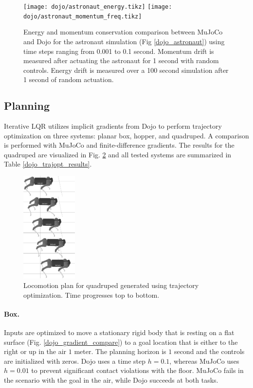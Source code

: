 \begin{figure}[H]
	\begin{center}
		\texttt{[image: dojo/astronaut\_energy.tikz]}
		\texttt{[image: dojo/astronaut\_momentum\_freq.tikz]}
	\end{center}
	\caption[Astronaut energy and momentum drift numerical comparison between Dojo and MuJoCo]{
		Energy and momentum conservation comparison between MuJoCo and Dojo for the astronaut simulation (Fig \ref{dojo_astronaut}) using time steps ranging from 0.001 to 0.1 second. Momentum drift is measured after actuating the astronaut for 1 second with random controls. Energy drift is measured over a 100 second simulation after 1 second of random actuation.}
	\label{dojo_drift}
\end{figure}

\subsection{Planning} 

Iterative LQR \cite{howell2022trajectory} utilizes implicit gradients from Dojo to perform trajectory optimization on three systems: planar box, hopper, and quadruped. A comparison is performed with MuJoCo and finite-difference gradients. The results for the quadruped are visualized in Fig. \ref{dojo_trajopt_vis} and all tested systems are summarized in Table \ref{dojo_trajopt_results}. 

\begin{figure}[H]
	\centering
	\includegraphics[width=0.25\textwidth]{dojo/quadruped_stack.png}
	\caption[Locomotion plan for quadruped]{Locomotion plan for quadruped generated using trajectory optimization. Time progresses top to bottom.}
	\label{dojo_trajopt_vis}
\end{figure}

\paragraph{Box.} Inputs are optimized to move a stationary rigid body that is resting on a flat surface (Fig. \ref{dojo_gradient_compare}) to a goal location that is either to the right or up in the air $1$ meter. The planning horizon is $1$ second and the controls are initialized with zeros. Dojo uses a time step $h = 0.1$, whereas MuJoCo uses $h = 0.01$ to prevent significant contact violations with the floor. MuJoCo fails in the scenario with the goal in the air, while Dojo succeeds at both tasks.

